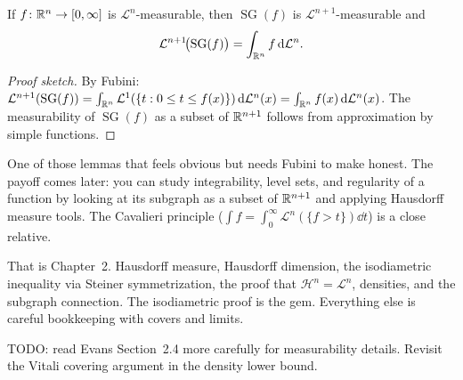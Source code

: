 \begin{lemma}\label{lem:subgraph-measurable}
If $f \colon \mathbb{R}^n \to [0,\infty]$ is $\mathcal{L}^n$-measurable, then
$\operatorname{SG}(f)$ is $\mathcal{L}^{n+1}$-measurable and
\[
  \mathcal{L}^{n+1}\!\bigl(\operatorname{SG}(f)\bigr)
  = \int_{\mathbb{R}^n} f \,\mathrm{d}\mathcal{L}^n.
\]
\end{lemma}

\begin{proof}[Proof sketch]
By Fubini:
$\mathcal{L}^{n+1}(\operatorname{SG}(f))
= \int_{\mathbb{R}^n} \mathcal{L}^1(\{t : 0 \le t \le f(x)\})
\,\mathrm{d}\mathcal{L}^n(x)
= \int_{\mathbb{R}^n} f(x) \,\mathrm{d}\mathcal{L}^n(x)$.
The measurability of $\operatorname{SG}(f)$ as a subset of $\mathbb{R}^{n+1}$
follows from approximation by simple functions. \qedhere
\end{proof}

One of those lemmas that feels obvious but needs Fubini to make honest.
The payoff comes later: you can study integrability, level sets, and
regularity of a function by looking at its subgraph as a subset of
$\mathbb{R}^{n+1}$ and applying Hausdorff measure tools. The Cavalieri principle
($\int f = \int_0^\infty \mathcal{L}^n(\{f > t\})\dd t$) is a close
relative.

\bigskip

That is Chapter~2. Hausdorff measure, Hausdorff dimension, the
isodiametric inequality via Steiner symmetrization, the proof that
$\mathcal{H}^n = \mathcal{L}^n$, densities, and the subgraph
connection. The isodiametric proof is the gem. Everything else is careful bookkeeping with covers and limits.

TODO: read Evans Section~2.4 more carefully for measurability details.
Revisit the Vitali covering argument in the density lower bound.
